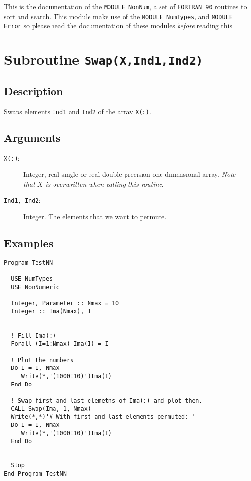 This is the documentation of the \texttt{MODULE NonNum}, a set
of \texttt{FORTRAN 90} routines to sort and search. This module make
use of the \texttt{MODULE NumTypes}, and \texttt{MODULE Error} so
please read the documentation of these modules \emph{before} reading
this. 

\section{Subroutine \texttt{Swap(X,Ind1,Ind2)}}

\subsection{Description}

Swaps elements \texttt{Ind1} and \texttt{Ind2} of the array
\texttt{X(:)}. 

\subsection{Arguments}

\begin{description}
\item[\texttt{X(:)}: ] Integer, real single or real double precision one
  dimensional array. \emph{Note that
    $X$ is overwritten when calling this routine}. 
\item[\texttt{Ind1, Ind2}: ] Integer. The elements that we want to
  permute. 
\end{description}

\subsection{Examples}

\begin{lstlisting}[emph=Swap,
                   emphstyle=\color{blue},
                   frame=trBL,
                   caption=Sorting data.,
                   label=swap]
Program TestNN

  USE NumTypes
  USE NonNumeric

  Integer, Parameter :: Nmax = 10
  Integer :: Ima(Nmax), I


  ! Fill Ima(:) 
  Forall (I=1:Nmax) Ima(I) = I

  ! Plot the numbers
  Do I = 1, Nmax
     Write(*,'(1000I10)')Ima(I)
  End Do

  ! Swap first and last elemetns of Ima(:) and plot them.
  CALL Swap(Ima, 1, Nmax)
  Write(*,*)'# With first and last elements permuted: '
  Do I = 1, Nmax
     Write(*,'(1000I10)')Ima(I)
  End Do


  Stop
End Program TestNN
\end{lstlisting}

